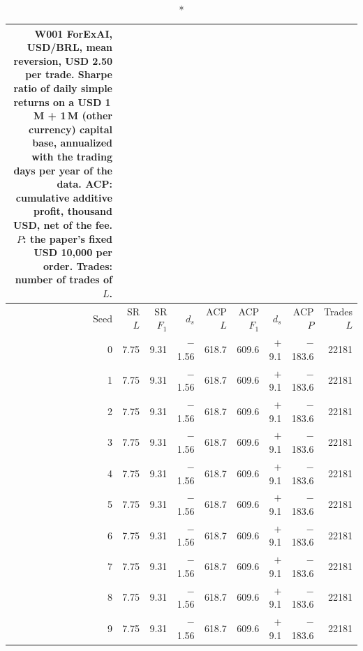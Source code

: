 \begin{longtable}{@{}rrrrrrrrr@{}}
\caption*{\small W001 ForExAI, USD/BRL, mean reversion, USD 2.50 per trade. Sharpe ratio of daily simple returns on a USD 1\,M + 1\,M (other currency) capital base, annualized with the trading days per year of the data. ACP: cumulative additive profit, thousand USD, net of the fee. $P$: the paper's fixed USD 10,000 per order. Trades: number of trades of $L$.}\\
\toprule
Seed & SR $L$ & SR $F_1$ & $d_s$ & ACP $L$ & ACP $F_1$ & $d_s$ & ACP $P$ & Trades $L$\\ \midrule\endhead
0 & 7.75 & 9.31 & $-$1.56 & 618.7 & 609.6 & $+$9.1 & $-$183.6 & 22181\\
1 & 7.75 & 9.31 & $-$1.56 & 618.7 & 609.6 & $+$9.1 & $-$183.6 & 22181\\
2 & 7.75 & 9.31 & $-$1.56 & 618.7 & 609.6 & $+$9.1 & $-$183.6 & 22181\\
3 & 7.75 & 9.31 & $-$1.56 & 618.7 & 609.6 & $+$9.1 & $-$183.6 & 22181\\
4 & 7.75 & 9.31 & $-$1.56 & 618.7 & 609.6 & $+$9.1 & $-$183.6 & 22181\\
5 & 7.75 & 9.31 & $-$1.56 & 618.7 & 609.6 & $+$9.1 & $-$183.6 & 22181\\
6 & 7.75 & 9.31 & $-$1.56 & 618.7 & 609.6 & $+$9.1 & $-$183.6 & 22181\\
7 & 7.75 & 9.31 & $-$1.56 & 618.7 & 609.6 & $+$9.1 & $-$183.6 & 22181\\
8 & 7.75 & 9.31 & $-$1.56 & 618.7 & 609.6 & $+$9.1 & $-$183.6 & 22181\\
9 & 7.75 & 9.31 & $-$1.56 & 618.7 & 609.6 & $+$9.1 & $-$183.6 & 22181\\
\bottomrule\end{longtable}
